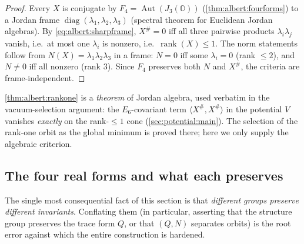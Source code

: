 \begin{proof}
Every $X$ is conjugate by $F_{4}=\operatorname{Aut}(J_{3}(\mathbb{O}))$
(\autoref{thm:albert:fourforms}) to a Jordan frame
$\operatorname{diag}(\lambda_{1},\lambda_{2},\lambda_{3})$
(spectral theorem for Euclidean Jordan algebras). By
\eqref{eq:albert:sharpframe}, $X^{\#}=0$ iff all three pairwise products
$\lambda_{i}\lambda_{j}$ vanish, i.e.\ at most one $\lambda_{i}$ is
nonzero, i.e.\ $\operatorname{rank}(X)\le1$. The norm statements follow
from $N(X)=\lambda_{1}\lambda_{2}\lambda_{3}$ in a frame: $N=0$ iff some
$\lambda_{i}=0$ (rank $\le 2$), and $N\neq0$ iff all nonzero (rank $3$).
Since $F_{4}$ preserves both $N$ and $X^{\#}$, the criteria are
frame-independent.
\end{proof}

\begin{remark}[Scope]\label{rmk:albert:scope}
\autoref{thm:albert:rankone} is a \emph{theorem} of Jordan algebra, used
verbatim in the vacuum-selection argument: the $E_{6}$-covariant term
$\langle X^{\#},X^{\#}\rangle$ in the potential $V$ vanishes
\emph{exactly} on the rank-$\le1$ cone (\autoref{sec:potential:main}).
The selection of the rank-one orbit as the global minimum is proved
there; here we only supply the algebraic criterion.
\end{remark}

\subsection{The four real forms and what each preserves}
\label{sec:albert:groups}
\label{sec:realform:main}

The single most consequential fact of this section is that
\emph{different groups preserve different invariants}. Conflating them
(in particular, asserting that the structure group preserves the trace
form $Q$, or that $(Q,N)$ separates orbits) is the root error against
which the entire construction is hardened.

